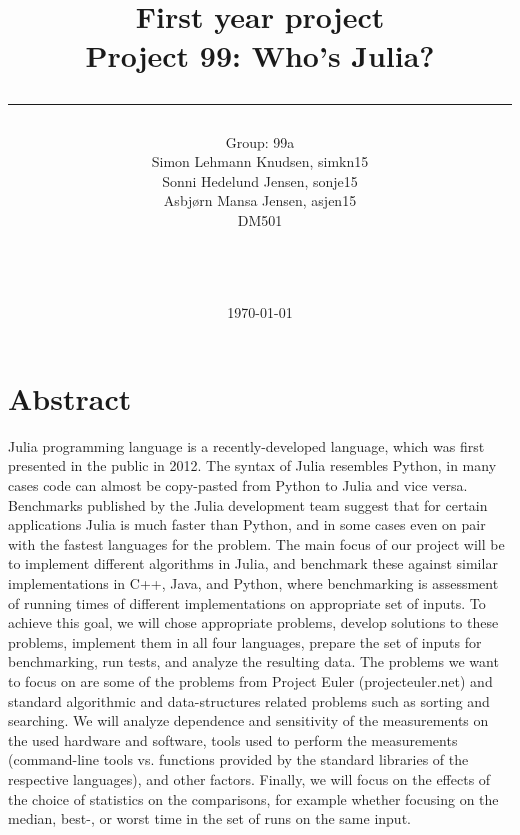 \documentclass[a4paper,11pt]{article}
\title{First year project\\Project 99: Who's Julia?\\\rule{10cm}{0.5mm}}
\author{Group: 99a\\Simon Lehmann Knudsen, simkn15\\Sonni Hedelund Jensen, sonje15\\Asbjørn Mansa Jensen, asjen15
\\ DM501\\\rule{5.5cm}{0.5mm}\\}
\date{\today}
\begin{document}
\maketitle

\vfill

\newpage
\section*{Abstract}
Julia programming language is a recently-developed language, which was first presented in the public in 2012. The syntax of Julia resembles Python, in many cases code can almost be copy-pasted from Python to Julia and vice versa. Benchmarks published by the Julia development team suggest that for certain applications Julia is much faster than Python, and in some cases even on pair with the fastest languages for the problem. The main focus of our project will be to implement different algorithms in Julia, and benchmark these against similar implementations in C++, Java, and Python, where benchmarking is assessment of running times of different implementations on appropriate set of inputs. To achieve this goal, we will chose appropriate problems, develop solutions to these problems, implement them in all four languages, prepare the set of inputs for benchmarking, run tests, and analyze the resulting data. The problems we want to focus on are some of the problems from Project Euler (projecteuler.net) and standard algorithmic and data-structures related problems such as sorting and searching. We will analyze dependence and sensitivity of the measurements on the used hardware and software, tools used to perform the measurements (command-line tools vs. functions provided by the standard libraries of the respective languages), and other factors. Finally, we will focus on the effects of the choice of statistics on the comparisons, for example whether focusing on the median, best-, or worst time in the set of runs on the same input.
\end{document}
